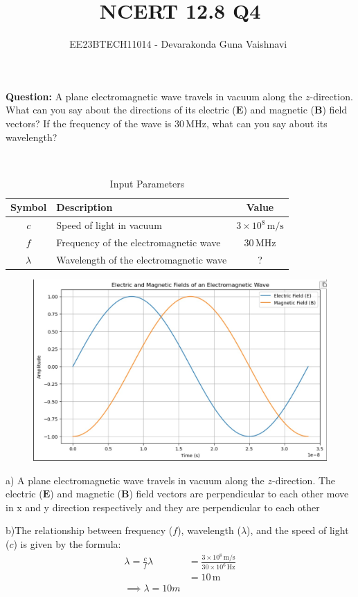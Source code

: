 \documentclass[a4,12pt,onecolumn]{IEEEtran}
\begin{document}
\title{NCERT 12.8 Q4}
\author{EE23BTECH11014 - Devarakonda Guna Vaishnavi $^{}$}
\textbf{Question:} A plane electromagnetic wave travels in vacuum along the \(z\)-direction. What can you say about the directions of its electric (\(\mathbf{E}\)) and magnetic (\(\mathbf{B}\)) field vectors? If the frequency of the wave is \(30 \, \text{MHz}\), what can you say about its wavelength?
 

\solution\\
\fi
\begin{table}[h]
    \centering
    \begin{tabular}{|c|l|c|}
\hline
Symbol & Description                               & Value                    \\ 
\hline
\(c\)    & Speed of light in vacuum                  & \(3 \times 10^8 \, \text{m/s}\) \\
\hline
\(f\)    & Frequency of the electromagnetic wave    & \(30 \, \text{MHz}\)     \\
\hline
\(\lambda\) & Wavelength of the electromagnetic wave   & ?                        \\ \hline
\end{tabular}
    \caption{Input Parameters}
\end{table}

\begin{figure}[h!]
	\centering
	\includegraphics[width=\columnwidth]{ ncert-physics/12/8/4/figs/emplot.jpeg}
\end{figure}
 a) A plane electromagnetic wave travels in vacuum along the \(z\)-direction. The electric (\(\mathbf{E}\)) and magnetic (\(\mathbf{B}\)) field vectors are perpendicular to each other move in x and y direction respectively and they are perpendicular to each other
 \vspace{0.2cm}

 b)The relationship between frequency (\(f\)), wavelength (\(\lambda\)), and the speed of light (\(c\)) is given by the formula:
\begin{align}
        \lambda = \frac{c}{f}
        \lambda &= \frac{3 \times 10^8 \, \text{m/s}}{30 \times 10^6 \, \text{Hz}} \\
        &= 10 \, \text{m}\\
\implies \lambda = 10m  
   \end{align}
\end{document}
